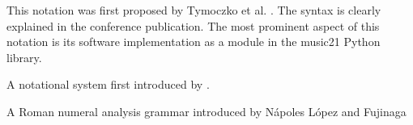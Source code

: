 This notation was first proposed by Tymoczko et al.
\parencite{tymoczko}. The syntax is clearly explained in the
conference publication. The most prominent aspect of this
notation is its software implementation as a module in the
music21 Python library.

A notational system first introduced by
\parencite{neuwirth}.

A Roman numeral analysis grammar introduced by N\'apoles
L\'opez and Fujinaga \parencite{napoleslopez}
